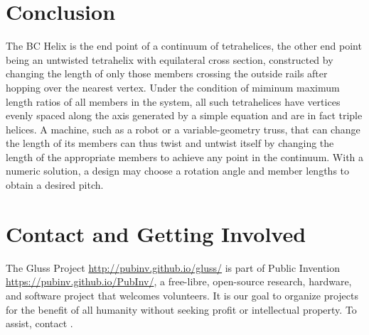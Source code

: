 \documentclass[review]{siamonline1116}
\begin{document}
\section{Conclusion}

The BC Helix is the end point of a continuum of tetrahelices, the
other end point being an untwisted tetrahelix with equilateral cross
section, constructed by changing the length of only those members
crossing the outside rails after hopping over the nearest
vertex. Under the condition of miminum maximum length ratios of
all members in the system, all such tetrahelices have vertices evenly
spaced along the axis generated by a simple equation and are in fact triple helices.
A machine, such as a robot or a variable-geometry truss, that can change
the length of its members can thus twist and untwist itself by
changing the length of the appropriate members to achieve any point in
the continuum. With a numeric solution, a design may choose
a rotation angle and member lengths to obtain a desired pitch.

\section{Contact and Getting Involved}

The Gluss Project \url{http://pubinv.github.io/gluss/} is part of Public Invention \url{https://pubinv.github.io/PubInv/},
a free-libre, open-source research, hardware, and software project that welcomes volunteers.
It is our goal to organize projects for the benefit of all humanity without seeking profit or intellectual property.
To assist, contact .



\end{document}
